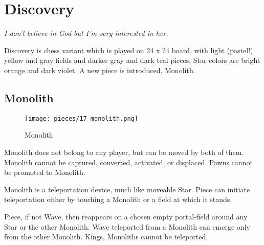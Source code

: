 

\chapter*{Discovery}
\label{ch:Discovery}

\begin{flushright}
\parbox{0.8\textwidth}{
\emph{I don't believe in God but I'm very interested in her. \newline
{} } }
\end{flushright}

\noindent
Discovery is chess variant which is played on 24 x 24 board, with
light (pastel!) yellow and gray fields and darker gray and dark teal
pieces. Star colors are bright orange and dark violet.
A new piece is introduced, Monolith.

\clearpage %

\section*{Monolith}
\label{sec:Discovery/Monolith}

\vspace*{-1.1\baselineskip}
\noindent
\begin{wrapfigure}[11]{l}{0.4\textwidth}
\centering
\texttt{[image: pieces/17\_monolith.png]}
\caption{Monolith}
\label{fig:17_monolith}
\end{wrapfigure}
Monolith does not belong to any player, but can be moved by both of them.
Monolith cannot be captured, converted, activated, or displaced.
Pawns cannot be promoted to Monolith.

Monolith is a teleportation device, much like moveable Star. Piece can
initiate teleportation either by touching a Monolith or a field at which
it stands.

Piece, if not Wave, then reappears on a chosen empty portal-field around
any Star or the other Monolith. Wave teleported from a Monolith can emerge
only from the other Monolith. Kings, Monoliths cannot be teleported.

